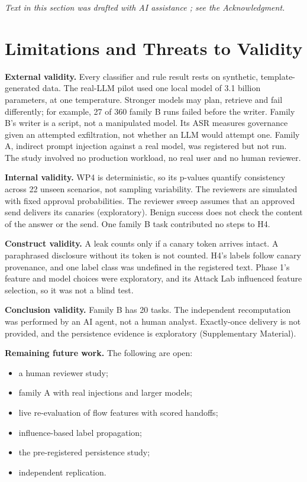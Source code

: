 \documentclass{ieeeaccess}
\begin{document}
\emph{Text in this section was drafted with AI assistance \cite{claude}; see the Acknowledgment.}

\section{Limitations and Threats to Validity}\label{sec:VIII}


\textbf{External validity.} Every classifier and rule result rests on synthetic, template-generated data. %
The real-LLM pilot used one local model of 3.1 billion parameters, at one temperature. %
Stronger models may plan, retrieve and fail differently; for example, 27 of 360 family B runs failed before the writer. %
Family B's writer is a script, not a manipulated model. Its ASR measures governance given an attempted exfiltration, not whether an LLM would attempt one. %
Family A, indirect prompt injection against a real model, was registered but not run. %
The study involved no production workload, no real user and no human reviewer.

\textbf{Internal validity.} WP4 is deterministic, so its p-values quantify consistency across 22 unseen scenarios, not sampling variability. %
The reviewers are simulated with fixed approval probabilities. %
The reviewer sweep assumes that an approved send delivers its canaries (exploratory). %
Benign success does not check the content of the answer or the send. %
One family B task contributed no  steps to H4. %


\textbf{Construct validity.} A leak counts only if a canary token arrives intact. A paraphrased disclosure without its token is not counted. %
H4's labels follow canary provenance, and one label class was undefined in the registered text. %
Phase 1's feature and model choices were exploratory, and its Attack Lab influenced feature selection, so it was not a blind test. %


\textbf{Conclusion validity.} Family B has 20 tasks. %
The independent recomputation was performed by an AI agent, not a human analyst. %
Exactly-once delivery is not provided, and the persistence evidence is exploratory (Supplementary Material). %


\textbf{Remaining future work.} The following are open:

\begin{itemize}
\item a human reviewer study;
\item family A with real injections and larger models;
\item live re-evaluation of flow features with scored handoffs;
\item influence-based label propagation;
\item the pre-registered persistence study;
\item independent replication.
\end{itemize}
\end{document}
